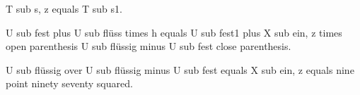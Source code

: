 T sub s, z equals T sub s1.

U sub fest plus U sub flüss times h equals U sub fest1 plus X sub ein, z times open parenthesis U sub flüssig minus U sub fest close parenthesis.

U sub flüssig over U sub flüssig minus U sub fest equals X sub ein, z equals nine point ninety seventy squared.